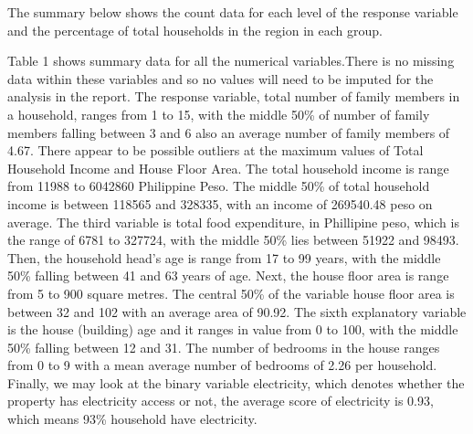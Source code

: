 \documentclass[
]{article}
\begin{document}
The summary below shows the count data for each level of the response
variable and the percentage of total households in the region in each
group.

Table 1 shows summary data for all the numerical variables.There is no
missing data within these variables and so no values will need to be
imputed for the analysis in the report. The response variable, total
number of family members in a household, ranges from 1 to 15, with the
middle 50\% of number of family members falling between 3 and 6 also an
average number of family members of 4.67. There appear to be possible
outliers at the maximum values of Total Household Income and House Floor
Area. The total household income is range from 11988 to 6042860
Philippine Peso. The middle 50\% of total household income is between
118565 and 328335, with an income of 269540.48 peso on average. The
third variable is total food expenditure, in Phillipine peso, which is
the range of 6781 to 327724, with the middle 50\% lies between 51922 and
98493. Then, the household head's age is range from 17 to 99 years, with
the middle 50\% falling between 41 and 63 years of age. Next, the house
floor area is range from 5 to 900 square metres. The central 50\% of the
variable house floor area is between 32 and 102 with an average area of
90.92. The sixth explanatory variable is the house (building) age and it
ranges in value from 0 to 100, with the middle 50\% falling between 12
and 31. The number of bedrooms in the house ranges from 0 to 9 with a
mean average number of bedrooms of 2.26 per household. Finally, we may
look at the binary variable electricity, which denotes whether the
property has electricity access or not, the average score of electricity
is 0.93, which means 93\% household have electricity.
\end{document}
